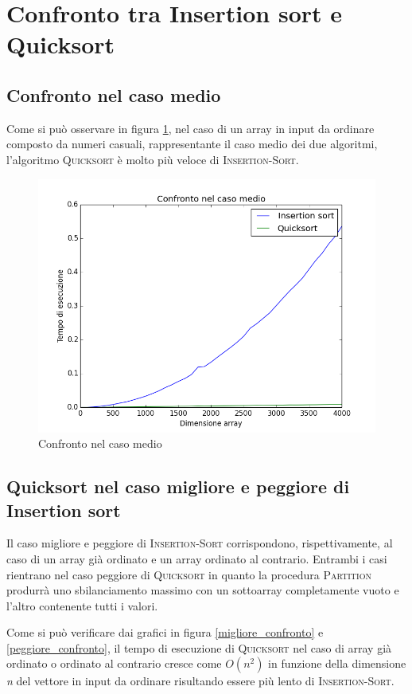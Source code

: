 \documentclass[11pt]{article}
\begin{document}
\section{Confronto tra Insertion sort e Quicksort}
\subsection{Confronto nel caso medio}
Come si può osservare in figura \ref{medio_confronto}, nel caso di un array in input da ordinare composto da numeri casuali, rappresentante il caso medio dei due algoritmi, l'algoritmo \textsc{Quicksort} è molto più veloce di \textsc{Insertion-Sort}.
\begin{figure}[h]
\centering
\includegraphics[scale=0.33,angle=0]{medio_confronto.png}
\caption{Confronto nel caso medio}
\label{medio_confronto}
\end{figure}
\subsection{Quicksort nel caso migliore e peggiore di Insertion sort}
Il caso migliore e peggiore di \textsc{Insertion-Sort} corrispondono, rispettivamente, al caso di un array già ordinato e un array ordinato al contrario. Entrambi i casi rientrano nel caso peggiore di \textsc{Quicksort} in quanto la procedura \textsc{Partition} produrrà uno sbilanciamento massimo con un sottoarray completamente vuoto e l'altro contenente tutti i valori.

Come si può verificare dai grafici in figura \ref{migliore_confronto} e \ref{peggiore_confronto}, il tempo di esecuzione di \textsc{Quicksort} nel caso di array già ordinato o ordinato al contrario cresce come $O(n^2)$ in funzione della dimensione \textit{n} del vettore in input da ordinare risultando essere più lento di \textsc{Insertion-Sort}.
\end{document}
